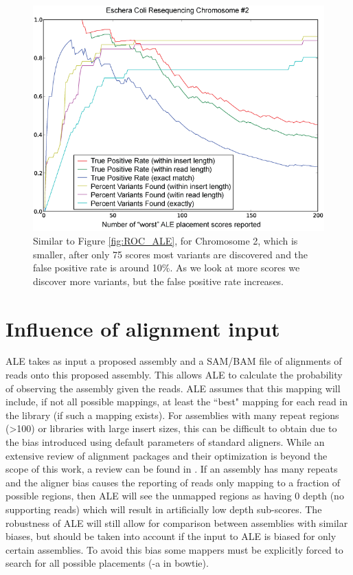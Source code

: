 \documentclass[phd,tocprelim]{cornell}
\begin{document}
\begin{figure}[hpt]
    \centerline{\includegraphics[width=\textwidth]{figures/ALE/fig6_bot.png}}
    \caption[ROC curve for chromosome 2]{Similar to Figure \ref{fig:ROC_ALE}, for Chromosome 2, which is smaller,
after only 75 scores most variants are discovered and the false positive rate is around 10\%. As we
look at more scores we discover more variants, but the false positive rate increases.}
 	\label{fig:ROC_ALE2}
\end{figure}

\section{Influence of alignment input} %
\label{sec:Influence of alignment input}

ALE takes as input a proposed assembly and a SAM/BAM \cite{Li2009} file of alignments of reads onto this proposed assembly. This allows ALE to calculate the probability of observing the assembly given the reads. ALE assumes that this mapping will include, if not all possible mappings, at least the ``best" mapping for each read in the library (if such a mapping exists). For assemblies with many repeat regions (>100) or libraries with large insert sizes, this can be difficult to obtain due to the bias introduced using default parameters of standard aligners. While an extensive review of alignment packages and their optimization is beyond the scope of this work, a review can be found in \cite{Li2010}. If an assembly has many repeats and the aligner bias causes the reporting of reads only mapping to a fraction of possible regions, then ALE will see the unmapped regions as having 0 depth (no supporting reads) which will result in artificially low depth sub-scores. The robustness of ALE will still allow for comparison between assemblies with similar biases, but should be taken into account if the input to ALE is biased for only certain assemblies. To avoid this bias some mappers must be explicitly forced to search for all possible placements (-a in bowtie).
\end{document}
